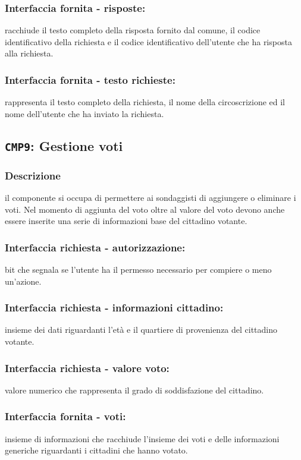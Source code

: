         \subsubsection{Interfaccia fornita - risposte:}
            racchiude il testo completo della risposta fornito dal comune, il codice identificativo della richiesta e il codice identificativo dell'utente che ha risposta alla richiesta.
        \subsubsection{Interfaccia fornita - testo richieste:}
            rappresenta il testo completo della richiesta, il nome della circoscrizione ed il nome dell'utente che ha inviato la richiesta.

    \subsection{\texttt{CMP9}: Gestione voti}
        \subsubsection{Descrizione}
            il componente si occupa di permettere ai sondaggisti di aggiungere o eliminare i voti. Nel momento di aggiunta del voto oltre al valore del voto devono anche essere inserite una serie di informazioni base del cittadino votante.
        \subsubsection{Interfaccia richiesta - autorizzazione:}
            bit che segnala se l'utente ha il permesso necessario per compiere o meno un'azione.
        \subsubsection{Interfaccia richiesta - informazioni cittadino:}
            insieme dei dati riguardanti l'età e il quartiere di provenienza del cittadino votante.
        \subsubsection{Interfaccia richiesta - valore voto:}
            valore numerico che rappresenta il grado di soddisfazione del cittadino.
        \subsubsection{Interfaccia fornita - voti:}
            insieme di informazioni che racchiude l'insieme dei voti e delle informazioni generiche riguardanti i cittadini che hanno votato.

